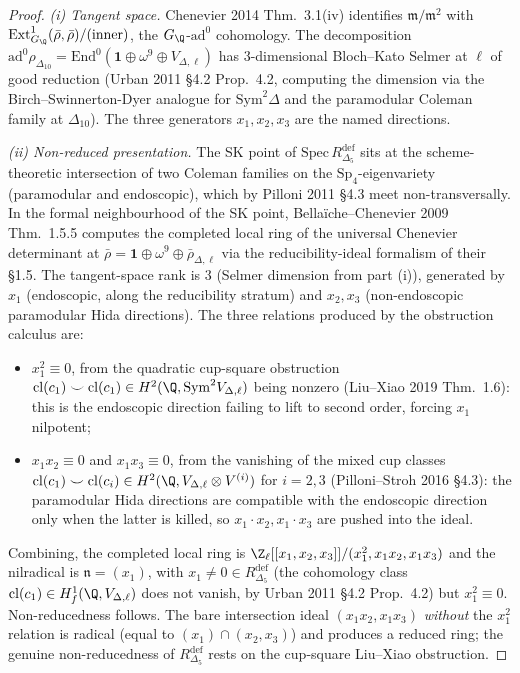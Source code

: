 \begin{proof}
\emph{(i) Tangent space.}
Chenevier 2014 Thm.~3.1(iv) identifies
$\mathfrak m / \mathfrak m^2$ with
$\mathrm{Ext}^1_{G_\Q}(\bar\rho, \bar\rho) / (\text{inner})$, the
$G_\Q$-$\mathrm{ad}^0$ cohomology. The decomposition
$\mathrm{ad}^0 \rho_{\Delta_{10}}
= \mathrm{End}^0(\mathbf 1 \oplus \omega^9 \oplus V_{\Delta, \ell})$
has $3$-dimensional Bloch--Kato Selmer at $\ell$ of good reduction
(Urban 2011 \S4.2 Prop.~4.2, computing the dimension via the
Birch--Swinnerton-Dyer analogue for $\mathrm{Sym}^2 \Delta$ and the
paramodular Coleman family at $\Delta_{10}$). The three generators
$x_1, x_2, x_3$ are the named directions.

\emph{(ii) Non-reduced presentation.}
The SK point of $\mathrm{Spec}\, R^{\mathrm{def}}_{\Delta_5}$ sits at
the scheme-theoretic intersection of two Coleman families on the
$\mathrm{Sp}_4$-eigenvariety (paramodular and endoscopic), which by
Pilloni 2011 \S4.3 meet non-transversally. In the formal neighbourhood
of the SK point, Bellaï\-che--Chenevier 2009 Thm.~1.5.5 computes the
completed local ring of the universal Chenevier determinant at
$\bar\rho = \mathbf 1\oplus\omega^9\oplus\bar\rho_{\Delta,\ell}$ via
the reducibility-ideal formalism of their \S1.5. The tangent-space
rank is $3$ (Selmer dimension from part (i)), generated by $x_1$
(endoscopic, along the reducibility stratum) and $x_2, x_3$
(non-endoscopic paramodular Hida directions). The three relations
produced by the obstruction calculus are:
\begin{itemize}
\item $x_1^2 \equiv 0$, from the quadratic cup-square obstruction
 $\mathrm{cl}(c_1)\smile\mathrm{cl}(c_1)\in H^2(\Q,
 \mathrm{Sym}^2 V_{\Delta,\ell})$ being nonzero
 (Liu--Xiao 2019 Thm.~1.6): this is the endoscopic direction
 failing to lift to second order, forcing $x_1$ nilpotent;
\item $x_1 x_2\equiv 0$ and $x_1 x_3\equiv 0$, from the vanishing of
 the mixed cup classes $\mathrm{cl}(c_1)\smile\mathrm{cl}(c_i)\in
 H^2(\Q, V_{\Delta,\ell}\otimes V^{(i)})$ for $i=2,3$
 (Pilloni--Stroh 2016 \S4.3): the paramodular Hida directions are
 compatible with the endoscopic direction only when the latter is
 killed, so $x_1 \cdot x_2, x_1\cdot x_3$ are pushed into the ideal.
\end{itemize}
Combining, the completed local ring is
$\Z_\ell[[x_1,x_2,x_3]]/(x_1^2, x_1 x_2, x_1 x_3)$ and the nilradical
is $\mathfrak n = (x_1)$, with $x_1\ne 0\in R^{\mathrm{def}}_{\Delta_5}$
(the cohomology class $\mathrm{cl}(c_1)\in H^1_f(\Q, V_{\Delta,\ell})$
does not vanish, by Urban 2011 \S4.2 Prop.~4.2) but
$x_1^2\equiv 0$. Non-reducedness follows. The bare
intersection ideal $(x_1 x_2, x_1 x_3)$ \emph{without} the $x_1^2$
relation is radical (equal to $(x_1)\cap(x_2,x_3)$) and produces a
reduced ring; the genuine non-reducedness of $R^{\mathrm{def}}_{\Delta_5}$
rests on the cup-square Liu--Xiao obstruction.


\end{proof}
